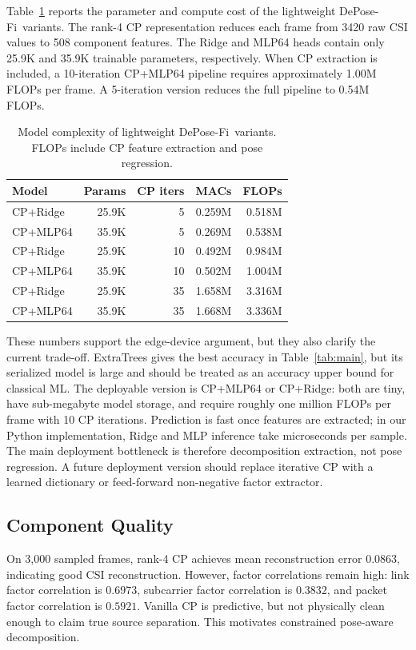 \documentclass[letterpaper]{article}
\newcommand{\method}{DePose-Fi}
\begin{document}
Table~\ref{tab:complexity} reports the parameter and compute cost of the lightweight \method\ variants. The rank-4 CP representation reduces each frame from 3420 raw CSI values to 508 component features. The Ridge and MLP64 heads contain only 25.9K and 35.9K trainable parameters, respectively. When CP extraction is included, a 10-iteration CP+MLP64 pipeline requires approximately 1.00M FLOPs per frame. A 5-iteration version reduces the full pipeline to 0.54M FLOPs.

\begin{table}[t]
\centering
\caption{Model complexity of lightweight \method\ variants. FLOPs include CP feature extraction and pose regression.}
\label{tab:complexity}
\begin{tabular}{lrrrr}
\toprule
Model & Params & CP iters & MACs & FLOPs \\
\midrule
CP+Ridge & 25.9K & 5 & 0.259M & 0.518M \\
CP+MLP64 & 35.9K & 5 & 0.269M & 0.538M \\
CP+Ridge & 25.9K & 10 & 0.492M & 0.984M \\
CP+MLP64 & 35.9K & 10 & 0.502M & 1.004M \\
CP+Ridge & 25.9K & 35 & 1.658M & 3.316M \\
CP+MLP64 & 35.9K & 35 & 1.668M & 3.336M \\
\bottomrule
\end{tabular}
\end{table}

These numbers support the edge-device argument, but they also clarify the current trade-off. ExtraTrees gives the best accuracy in Table~\ref{tab:main}, but its serialized model is large and should be treated as an accuracy upper bound for classical ML. The deployable version is CP+MLP64 or CP+Ridge: both are tiny, have sub-megabyte model storage, and require roughly one million FLOPs per frame with 10 CP iterations. Prediction is fast once features are extracted; in our Python implementation, Ridge and MLP inference take microseconds per sample. The main deployment bottleneck is therefore decomposition extraction, not pose regression. A future deployment version should replace iterative CP with a learned dictionary or feed-forward non-negative factor extractor.

\subsection{Component Quality}

On 3,000 sampled frames, rank-4 CP achieves mean reconstruction error $0.0863$, indicating good CSI reconstruction. However, factor correlations remain high: link factor correlation is $0.6973$, subcarrier factor correlation is $0.3832$, and packet factor correlation is $0.5921$. Vanilla CP is predictive, but not physically clean enough to claim true source separation. This motivates constrained pose-aware decomposition.
\end{document}
